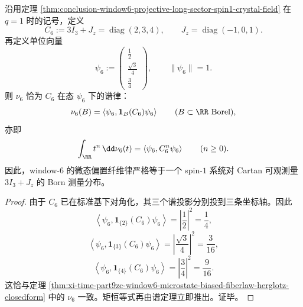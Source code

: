 \begin{theorem}\label{thm:xi-time-part9zc-window6-spin1-cartan-born-realization}
沿用定理 \ref{thm:conclusion-window6-projective-long-sector-spin1-crystal-field} 在 \(q=1\) 时的记号，定义
\[
C_6:=3I_3+J_z=\operatorname{diag}(2,3,4),
\qquad
J_z=\operatorname{diag}(-1,0,1).
\]
再定义单位向量
\[
\psi_6:=
\begin{pmatrix}
\frac12\\[1mm]
\frac{\sqrt3}{4}\\[1mm]
\frac34
\end{pmatrix},
\qquad
\|\psi_6\|=1.
\]
则 \(\nu_6\) 恰为 \(C_6\) 在态 \(\psi_6\) 下的谱律：
\[
\nu_6(B)=\left\langle \psi_6,\mathbf 1_B(C_6)\psi_6\right\rangle
\qquad (B\subset\RR\ \text{Borel}),
\]
亦即
\[
\int_{\RR} t^n\,\dd\nu_6(t)=\left\langle \psi_6,C_6^n\psi_6\right\rangle
\qquad (n\ge 0).
\]
因此，window-\(6\) 的微态偏置纤维律严格等于一个 spin-\(1\) 系统对 Cartan 可观测量 \(3I_3+J_z\) 的 Born 测量分布。
\end{theorem}
\begin{proof}
由于 \(C_6\) 已在标准基下对角化，其三个谱投影分别投到三条坐标轴。因此
\[
\left\langle \psi_6,\mathbf 1_{\{2\}}(C_6)\psi_6\right\rangle
=
\left|\frac12\right|^2
=
\frac14,
\]
\[
\left\langle \psi_6,\mathbf 1_{\{3\}}(C_6)\psi_6\right\rangle
=
\left|\frac{\sqrt3}{4}\right|^2
=
\frac3{16},
\]
\[
\left\langle \psi_6,\mathbf 1_{\{4\}}(C_6)\psi_6\right\rangle
=
\left|\frac34\right|^2
=
\frac9{16}.
\]
这恰与定理 \ref{thm:xi-time-part9zc-window6-microstate-biased-fiberlaw-herglotz-closedform} 中的 \(\nu_6\) 一致。矩恒等式再由谱定理立即推出。证毕。
\end{proof}

